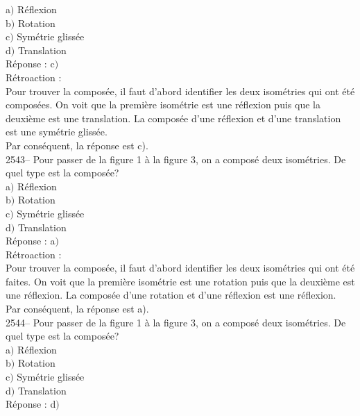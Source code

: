 \documentclass[letterpaper, 12pt]{article}
\begin{document}
a$)$  R\'eflexion \\
b$)$  Rotation\\
c$)$  Sym\'etrie gliss\'ee\\
d$)$  Translation \\

R\'eponse : c$)$\\

R\'etroaction :\\
Pour trouver la compos\'ee, il faut d'abord identifier les deux isom\'etries qui ont \'et\'e compos\'ees. On voit que la premi\`ere isom\'etrie est une r\'eflexion puis que la deuxi\`eme est une translation. La compos\'ee d'une r\'eflexion et d'une translation est une sym\'etrie gliss\'ee.\\
Par cons\'equent, la r\'eponse est c).\\


2543-- Pour passer de la figure 1  \`a la figure 3, on a compos\'e deux isom\'etries. De quel type est la compos\'ee?\\

a$)$  R\'eflexion \\
b$)$  Rotation\\
c$)$  Sym\'etrie gliss\'ee\\
d$)$  Translation \\

R\'eponse : a$)$\\

R\'etroaction :\\
Pour trouver la compos\'ee, il faut d'abord identifier les deux isom\'etries qui ont \'et\'e faites. On voit que la premi\`ere isom\'etrie est une rotation puis que la deuxi\`eme est une r\'eflexion. La compos\'ee d'une rotation et d'une r\'eflexion est une r\'eflexion.\\
Par cons\'equent, la r\'eponse est a).\\



2544-- Pour passer de la figure 1  \`a la figure 3, on a compos\'e deux isom\'etries. De quel type est la compos\'ee?\\

a$)$  R\'eflexion \\
b$)$  Rotation\\
c$)$  Sym\'etrie gliss\'ee\\
d$)$  Translation \\

R\'eponse : d$)$\\
\end{document}
